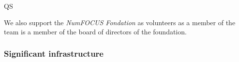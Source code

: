 \begin{sitedescription}{QS}
\begin{compactenum}
\item We also support the \emph{NumFOCUS Fondation} as volunteers as a member of the team is a member of the board of directors of the foundation.

\end{compactenum}

\subsubsection*{Significant infrastructure}

\end{sitedescription}

